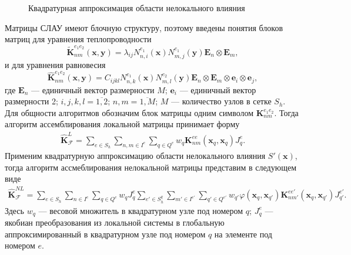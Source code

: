 \begin{figure}[ht]
    \caption{Квадратурная аппроксимация области нелокального влияния}\label{fig:ApproxSQ}
\end{figure}

Матрицы СЛАУ имеют блочную структуру, поэтому введены понятия блоков матриц для уравнения теплопроводности
\[
	\widetilde{\textbf{K}}_{nm}^{e_1 e_2} (\boldsymbol{x}, \boldsymbol{y}) =
	\lambda_{ij} N_{n,i}^{e_1} (\boldsymbol{x}) N_{m,j}^{e_1} (\boldsymbol{y})
	\boldsymbol{E}_n \otimes \boldsymbol{E}_m,
\]
и для уравнения равновесия
\[
	\widehat{\textbf{K}}_{nm}^{e_1 e_2} (\boldsymbol{x}, \boldsymbol{y}) = 
	C_{ijkl} N_{n,k}^{e_1} (\boldsymbol{x}) N_{m,l}^{e_2} (\boldsymbol{y}) \boldsymbol{E}_n \otimes \boldsymbol{E}_m \otimes \boldsymbol{e}_i \otimes \boldsymbol{e}_j,
\]
где $\boldsymbol{E}_n$ --- единичный вектор размерности $M$; $\boldsymbol{e}_i$ --- единичный вектор размерности 2; $i,j,k,l = \overline{1,2}$; $n,m = \overline{1,M}$; $M$ --- количество узлов в сетке $S_h$. Для общности алгоритмов обозначим блок матрицы одним символом $\textbf{K}_{nm}^{e_1 e_2}$. Тогда алгоритм ассемблирования локальной матрицы принимает форму
\begin{gather}
	\label{eq:localMatrix}
	\widehat{\textbf{K}}^L_{\mathcal{F}} =
	\sum\limits_{e \in S_h}
	\sum\limits_{n,m \in I^e}
	\sum\limits_{q \in Q^e}
	w_q \textbf{K}^{ee}_{nm} (\boldsymbol{x}_q, \boldsymbol{x}_q) J_q^e.
\end{gather}
Применим квадратурную аппроксимацию области нелокального влияния $S'(\boldsymbol{x})$, тогда алгоритм ассмеблирования нелокальной матрицы представим в следующем виде
\begin{gather}
	\label{eq:NonlocalMatrix}
	\widehat{\textbf{K}}^{NL}_{\mathcal{F}} =
	\sum\limits_{e \in S_h}
	\sum\limits_{n \in I^e}
	\sum\limits_{q \in Q^e}
	w_q J_q^e
	\sum\limits_{e' \in S_h^q}
	\sum\limits_{m' \in I^{e'}}
	\sum\limits_{q' \in Q^{e'}}
	w_{q'} \varphi(\boldsymbol{x}_q, \boldsymbol{x}_{q'}) 
	\textbf{K}_{nm'}^{e e'}(\boldsymbol{x}_q, \boldsymbol{x}_{q'}) J_{q'}^{e'}.
\end{gather}
Здесь $w_q$ --- весовой множитель в квадратурном узле под номером $q$; $J_q^e$ --- якобиан преобразования из локальной системы в глобальную аппроксимированный в квадратурном узле под номером $q$ на элементе под номером $e$.

